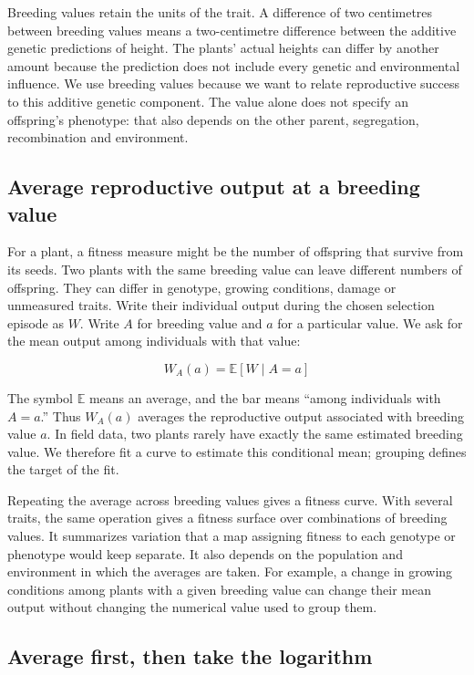 \documentclass[11pt]{article}
\newcommand{\E}{\mathbb{E}}
\begin{document}
Breeding values retain the units of the trait. A difference of two centimetres between breeding values means a two-centimetre difference between the additive genetic predictions of height. The plants' actual heights can differ by another amount because the prediction does not include every genetic and environmental influence. We use breeding values because we want to relate reproductive success to this additive genetic component. The value alone does not specify an offspring's phenotype: that also depends on the other parent, segregation, recombination and environment.

\subsection{Average reproductive output at a breeding value}

For a plant, a fitness measure might be the number of offspring that survive from its seeds. Two plants with the same breeding value can leave different numbers of offspring. They can differ in genotype, growing conditions, damage or unmeasured traits. Write their individual output during the chosen selection episode as $W$. Write $A$ for breeding value and $a$ for a particular value. We ask for the mean output among individuals with that value:

\begin{equation}
W_A(a)=\E[W\mid A=a]
\label{eq:guide-target}
\end{equation}

The symbol $\E$ means an average, and the bar means ``among individuals with $A=a$.'' Thus $W_A(a)$ averages the reproductive output associated with breeding value $a$. In field data, two plants rarely have exactly the same estimated breeding value. We therefore fit a curve to estimate this conditional mean; grouping defines the target of the fit.

Repeating the average across breeding values gives a fitness curve. With several traits, the same operation gives a fitness surface over combinations of breeding values. It summarizes variation that a map assigning fitness to each genotype or phenotype would keep separate. It also depends on the population and environment in which the averages are taken. For example, a change in growing conditions among plants with a given breeding value can change their mean output without changing the numerical value used to group them.

\subsection{Average first, then take the logarithm}
\end{document}
